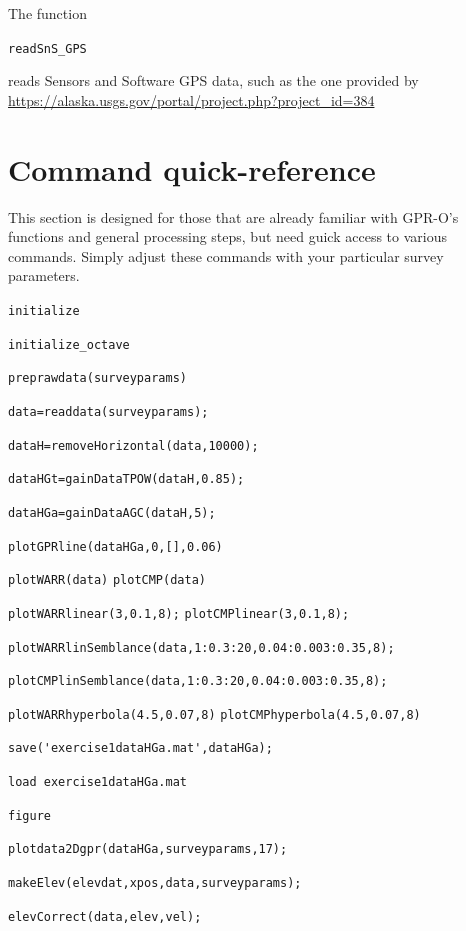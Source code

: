 \documentclass[11pt]{article}
\begin{document}
The function

\qquad \verb#readSnS_GPS# 

reads Sensors and Software GPS data, such as the one provided by 
\url{https://alaska.usgs.gov/portal/project.php?project_id=384} 

\section{Command quick-reference}

This section is designed for those that are already familiar with GPR-O's
functions and general processing steps, but need guick access to
various commands. Simply adjust these commands with your particular
survey parameters.

\qquad \verb#initialize#
	
\qquad \verb#initialize_octave#

\qquad \verb#preprawdata(surveyparams)#

\qquad \verb#data=readdata(surveyparams);#

\qquad \verb#dataH=removeHorizontal(data,10000);#

\qquad \verb#dataHGt=gainDataTPOW(dataH,0.85);#

\qquad \verb#dataHGa=gainDataAGC(dataH,5);#

\qquad \verb#plotGPRline(dataHGa,0,[],0.06)#

\qquad \verb#plotWARR(data)#						\qquad \verb#plotCMP(data)#

\qquad \verb#plotWARRlinear(3,0.1,8);#			\qquad \verb#plotCMPlinear(3,0.1,8);#

\qquad \verb#plotWARRlinSemblance(data,1:0.3:20,0.04:0.003:0.35,8);#

\qquad \verb#plotCMPlinSemblance(data,1:0.3:20,0.04:0.003:0.35,8);#

\qquad \verb#plotWARRhyperbola(4.5,0.07,8)#			\qquad \verb#plotCMPhyperbola(4.5,0.07,8)#

\qquad \verb#save('exercise1dataHGa.mat',dataHGa);#

\qquad \verb#load exercise1dataHGa.mat#

\qquad \verb#figure#

\qquad \verb#plotdata2Dgpr(dataHGa,surveyparams,17);#

\qquad \verb#makeElev(elevdat,xpos,data,surveyparams);#

\qquad \verb#elevCorrect(data,elev,vel);#
\end{document}
